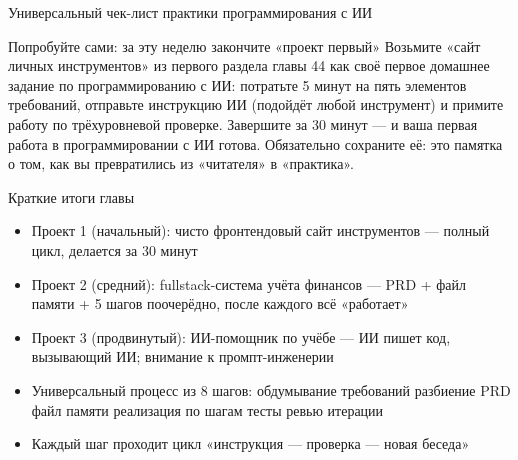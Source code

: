 \begin{center}\small\color{gray}Универсальный чек-лист практики программирования с ИИ\end{center}

\begin{tcbpractice}{Попробуйте сами: за эту неделю закончите «проект первый»}
Возьмите «сайт личных инструментов» из первого раздела главы 44 как своё первое домашнее задание по программированию с ИИ: потратьте 5 минут на пять элементов требований, отправьте инструкцию ИИ (подойдёт любой инструмент) и примите работу по трёхуровневой проверке. Завершите за 30 минут — и ваша первая работа в программировании с ИИ готова. Обязательно сохраните её: это памятка о том, как вы превратились из «читателя» в «практика».

\end{tcbpractice}

\begin{tcbsummary}{Краткие итоги главы}
\begin{itemize}
  \item Проект 1 (начальный): чисто фронтендовый сайт инструментов — полный цикл, делается за 30 минут
  \item Проект 2 (средний): fullstack-система учёта финансов — PRD + файл памяти + 5 шагов поочерёдно, после каждого всё «работает»
  \item Проект 3 (продвинутый): ИИ-помощник по учёбе — ИИ пишет код, вызывающий ИИ; внимание к промпт-инженерии
  \item Универсальный процесс из 8 шагов: обдумывание требований разбиение PRD файл памяти реализация по шагам тесты ревью итерации
  \item Каждый шаг проходит цикл «инструкция — проверка — новая беседа»
\end{itemize}

\end{tcbsummary}
